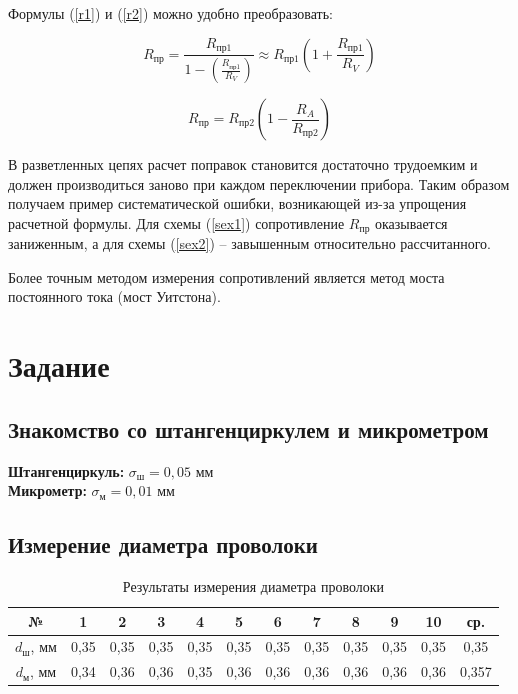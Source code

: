 \documentclass[a4paper, 12pt]{article}
\begin{document}
	\begin{center}
		Формулы (\ref{r1}) и (\ref{r2}) можно удобно преобразовать:
	
		\begin{minipage}{0.45\textwidth}
			\centering
			\begin{equation}\label{r3}
				R_\text{пр} = \frac{R_\text{пр1}}{1 - \left(\frac{R_\text{пр1}}{R_V} \right)} \approx R_\text{пр1}\left(1 + \frac{R_\text{пр1}}{R_V} \right)
			\end{equation}
		\end{minipage}
		\begin{minipage}{0.45\textwidth}
			\centering
			\begin{equation}\label{r4}
				R_\text{пр} = R_\text{пр2}\left(1-\frac{R_A}{R_\text{пр2}} \right)
			\end{equation}
		\end{minipage}
	\end{center}
		
	В разветленных цепях расчет поправок становится достаточно трудоемким и должен производиться заново при каждом переключении прибора. Таким образом получаем пример систематической ошибки, возникающей из-за упрощения расчетной формулы. Для схемы (\ref{sex1}) сопротивление $R_\text{пр}$ оказывается заниженным, а для схемы (\ref{sex2}) -- завышенным относительно рассчитанного.
	
	Более точным методом измерения сопротивлений является метод моста постоянного тока (мост Уитстона).
	
\section{Задание}
	\subsection{Знакомство со штангенциркулем и микрометром}
	
	\textbf{Штангенциркуль:} $ \sigma_\text{ш} = 0,05 \text{ мм}$\\
	\textbf{Микрометр:} $ \sigma_\text{м} = 0,01 \text{ мм}$
	
	
	\subsection{Измерение диаметра проволоки}
	\begin{table}[h]
		\begin{center}
			\begin{tabular}{|c|c|c|c|c|c|c|c|c|c|c|c|}
				\hline
				№ & 1 & 2 & 3 & 4 & 5 & 6 & 7 & 8 & 9 & 10 & ср. \\
				\hline
				$d_\text{ш}$, мм & 0,35 & 0,35& 0,35& 0,35& 0,35& 0,35& 0,35& 0,35& 0,35& 0,35& 0,35\\ 
				\hline
				$d_\text{м}$, мм & 0,34 & 0,36 & 0,36 & 0,35 & 0,36& 0,36& 0,36& 0,36& 0,36& 0,36& 0,357\\ 
				\hline
			\end{tabular}
		\end{center}
		\caption{Результаты измерения диаметра проволоки}
		\label{dtab}
	\end{table}
	
\end{document}
